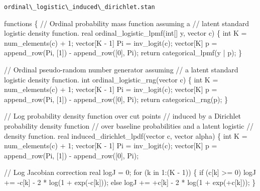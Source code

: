 \documentclass[
  letterpaper,
  DIV=11,
  numbers=noendperiod]{scrartcl}
\newenvironment{Shaded}{\begin{snugshade}}{\end{snugshade}}
\newcommand{\CommentTok}[1]{\textcolor[rgb]{0.37,0.37,0.37}{#1}}
\newcommand{\ControlFlowTok}[1]{\textcolor[rgb]{0.00,0.23,0.31}{#1}}
\newcommand{\DataTypeTok}[1]{\textcolor[rgb]{0.68,0.00,0.00}{#1}}
\newcommand{\DecValTok}[1]{\textcolor[rgb]{0.68,0.00,0.00}{#1}}
\newcommand{\KeywordTok}[1]{\textcolor[rgb]{0.00,0.23,0.31}{#1}}
\newcommand{\NormalTok}[1]{\textcolor[rgb]{0.00,0.23,0.31}{#1}}
\begin{document}
\begin{codelisting}

\caption{\texttt{ordinal\textbackslash\_logistic\textbackslash\_induced\textbackslash\_dirichlet.stan}}

\begin{Shaded}
\begin{Highlighting}[]
\KeywordTok{functions}\NormalTok{ \{}
  \CommentTok{// Ordinal probability mass function assuming a}
  \CommentTok{// latent standard logistic density function.}
  \DataTypeTok{real}\NormalTok{ ordinal\_logistic\_lpmf(}\DataTypeTok{int}\NormalTok{[] y, }\DataTypeTok{vector}\NormalTok{ c) \{}
    \DataTypeTok{int}\NormalTok{ K = num\_elements(c) + }\DecValTok{1}\NormalTok{;}
    \DataTypeTok{vector}\NormalTok{[K {-} }\DecValTok{1}\NormalTok{] Pi = inv\_logit(c);}
    \DataTypeTok{vector}\NormalTok{[K] p = append\_row(Pi, [}\DecValTok{1}\NormalTok{]\textquotesingle{}) {-} append\_row([}\DecValTok{0}\NormalTok{]\textquotesingle{}, Pi);}
    \ControlFlowTok{return}\NormalTok{ categorical\_lpmf(y | p);}
\NormalTok{  \}}

  \CommentTok{// Ordinal pseudo{-}random number generator assuming}
  \CommentTok{// a latent standard logistic density function.}
  \DataTypeTok{int}\NormalTok{ ordinal\_logistic\_rng(}\DataTypeTok{vector}\NormalTok{ c) \{}
    \DataTypeTok{int}\NormalTok{ K = num\_elements(c) + }\DecValTok{1}\NormalTok{;}
    \DataTypeTok{vector}\NormalTok{[K {-} }\DecValTok{1}\NormalTok{] Pi = inv\_logit(c);}
    \DataTypeTok{vector}\NormalTok{[K] p = append\_row(Pi, [}\DecValTok{1}\NormalTok{]\textquotesingle{}) {-} append\_row([}\DecValTok{0}\NormalTok{]\textquotesingle{}, Pi);}
    \ControlFlowTok{return}\NormalTok{ categorical\_rng(p);}
\NormalTok{  \}}

  \CommentTok{// Log probability density function over cut points}
  \CommentTok{// induced by a Dirichlet probability density function}
  \CommentTok{// over baseline probabilities and a latent logistic}
  \CommentTok{// density function.}
  \DataTypeTok{real}\NormalTok{ induced\_dirichlet\_lpdf(}\DataTypeTok{vector}\NormalTok{ c, }\DataTypeTok{vector}\NormalTok{ alpha) \{}
    \DataTypeTok{int}\NormalTok{ K = num\_elements(c) + }\DecValTok{1}\NormalTok{;}
    \DataTypeTok{vector}\NormalTok{[K {-} }\DecValTok{1}\NormalTok{] Pi = inv\_logit(c);}
    \DataTypeTok{vector}\NormalTok{[K] p = append\_row(Pi, [}\DecValTok{1}\NormalTok{]\textquotesingle{}) {-} append\_row([}\DecValTok{0}\NormalTok{]\textquotesingle{}, Pi);}

    \CommentTok{// Log Jacobian correction}
    \DataTypeTok{real}\NormalTok{ logJ = }\DecValTok{0}\NormalTok{;}
    \ControlFlowTok{for}\NormalTok{ (k }\ControlFlowTok{in} \DecValTok{1}\NormalTok{:(K {-} }\DecValTok{1}\NormalTok{)) \{}
      \ControlFlowTok{if}\NormalTok{ (c[k] \textgreater{}= }\DecValTok{0}\NormalTok{)}
\NormalTok{        logJ += {-}c[k] {-} }\DecValTok{2}\NormalTok{ * log(}\DecValTok{1}\NormalTok{ + exp({-}c[k]));}
      \ControlFlowTok{else}
\NormalTok{        logJ += +c[k] {-} }\DecValTok{2}\NormalTok{ * log(}\DecValTok{1}\NormalTok{ + exp(+c[k]));}
\NormalTok{    \}}


\end{Highlighting}
\end{Shaded}
\end{codelisting}
\end{document}

